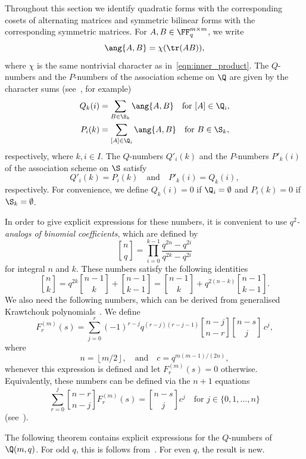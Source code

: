 Throughout this section we identify quadratic forms with the corresponding cosets of alternating matrices and symmetric bilinear forms with the corresponding symmetric matrices. For $A,B\in\FF_q^{m\times m}$, we write
\[
\ang{A,B}=\chi(\tr(AB)),
\]
where $\chi$ is the same nontrivial character as in~\eqref{eqn:inner_product}. 
The $Q$-numbers and the $P$-numbers of the association scheme on $\Q$ are given by the character sums (see~\cite[Section V]{DelLev1998}, for example)
\begin{align}
Q_k(i)&=\sum_{B\in\S_k}\ang{A,B}\quad \text{for $[A]\in\Q_i$},   \label{eqn:Q_char_sum}\\
P_i(k)&=\sum_{[A]\in\Q_i}\ang{A,B}\quad \text{for $B\in\S_k$},   \label{eqn:P_char_sum}
\end{align}
respectively, where $k,i\in I$. The $Q$-numbers $Q'_i(k)$ and the $P$-numbers $P'_k(i)$ of the association scheme on $\S$ satisfy
\[
Q'_i(k)=P_i(k)\quad\text{and}\quad P'_k(i)=Q_k(i),
\]
respectively. For convenience, we define $Q_k(i)=0$ if $\Q_i=\emptyset$ and $P_i(k)=0$ if $\S_k=\emptyset$. 
\par
In order to give explicit expressions for these numbers, it is convenient to use \emph{$q^2$-analogs of binomial coefficients}, which are defined by
\[
\genfrac{[}{]}{0pt}{}{n}{q}
=\prod_{i=0}^{k-1}\frac{q^{2n}-q^{2i}}{q^{2k}-q^{2i}}
\]
for integral $n$ and $k$. These numbers satisfy the following identities
\begin{equation}
%
\genfrac{[}{]}{0pt}{}{n}{k}
=q^{2k}
\genfrac{[}{]}{0pt}{}{n-1}{k}+\genfrac{[}{]}{0pt}{}{n-1}{k-1}=
\genfrac{[}{]}{0pt}{}{n-1}{k}+q^{2(n-k)}\genfrac{[}{]}{0pt}{}{n-1}{k-1}.   \label{eqn:Pascal_triangle}
\end{equation}
We also need the following numbers, which can be derived from generalised Krawtchouk polynomials~\cite{DelGoe1975,Del1976}. We define 
\[
F^{(m)}_r(s)=\sum_{j=0}^r(-1)^{r-j}q^{(r-j)(r-j-1)}
\genfrac{[}{]}{0pt}{}{n-j}{n-r}\genfrac{[}{]}{0pt}{}{n-s}{j}\, c^j,
\]
where
\[
n=\left\lfloor m/2\right\rfloor,\quad\text{and}\quad c=q^{m(m-1)/(2n)},
\]
whenever this expression is defined and let $F^{(m)}_r(s)=0$ otherwise. Equivalently, these numbers can be defined via the $n+1$ equations 
\begin{equation}
\sum_{r=0}^j\genfrac{[}{]}{0pt}{}{n-r}{n-j} F^{(m)}_r(s)=
\genfrac{[}{]}{0pt}{}{n-s}{j}c^j\quad\text{for $j\in\{0,1,\dots,n\}$}   \label{eqn:ev_transform}
\end{equation}
(see~\cite[(29)]{DelGoe1975}).
\par
The following theorem contains explicit expressions for the $Q$-numbers of $\Q(m,q)$. For odd $q$, this is follows from~\cite[Theorem~2.2]{Sch2015}. For even $q$, the result is new.
